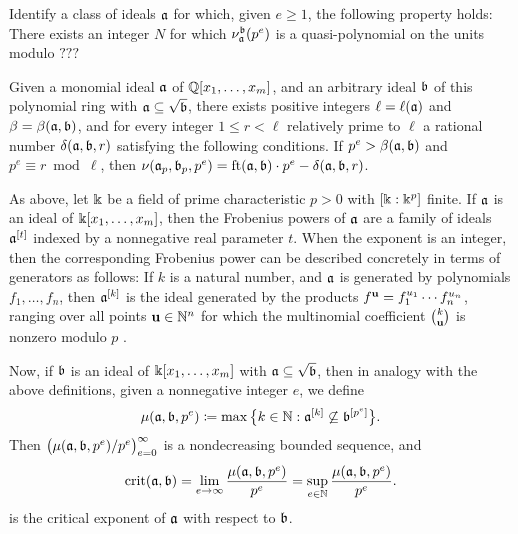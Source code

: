 \documentclass[11pt]{amsart}
\begin{document}
\begin{problem}
Identify a class of ideals $\mathfrak{a}$ for which, given $e \geq 1$, the following property holds:  There exists an integer $N$ for which $\nu_{\mathfrak{a}}^{\mathfrak{b}}(p^e)$ is a quasi-polynomial on the units modulo $???$
\end{problem}
%
%
\begin{theorem}
   \label{general-nu-theorem: T}
   Given a monomial ideal $\mathfrak{a}$ of $\mathbb{Q}[x_1, \ldots, x_m]$, and an arbitrary ideal $\mathfrak{b}$ of this polynomial ring with $\mathfrak{a} \subseteq \sqrt{\mathfrak{b}}$, there exists positive integers $\ell = \ell(\mathfrak{a})$ and  $\beta = \beta(\mathfrak{a}, \mathfrak{b})$, and for every integer $1 \leq r < \ell$ relatively prime to $\ell$ a rational number $\delta(\mathfrak{a}, \mathfrak{b}, r)$ satisfying the following conditions.
   If $p^e > \beta(\mathfrak{a}, \mathfrak{b})$ and $p^e \equiv r \bmod \ell$, then $ \nu(\mathfrak{a}_p, \mathfrak{b}_p, p^e) = \operatorname{ft}(\mathfrak{a}, \mathfrak{b}) \cdot p^e - \delta(\mathfrak{a}, \mathfrak{b}, r)$.
\end{theorem}

As above, let $\Bbbk$ be a field of prime characteristic $p>0$ with $[\Bbbk: \Bbbk^p]$ finite.
If $\mathfrak{a}$ is an ideal of $\Bbbk[x_1, \ldots, x_m]$, then the Frobenius powers of $\mathfrak{a}$ are a family of ideals $\mathfrak{a}^{[t]}$ indexed by a nonnegative real parameter $t$.
When the exponent is an integer, then the corresponding Frobenius power can be described concretely in terms of generators as follows:
If $k$ is a natural number, and $\mathfrak{a}$ is generated by polynomials $f_1, \ldots, f_n$, then $\mathfrak{a}^{[k]}$ is the ideal generated by the products $f^{\mathbf{u}} = f_1^{u_1}\cdots f_n^{u_n}$, ranging over all points $\mathbf{u} \in \mathbb{N}^n$ for which the multinomial coefficient $\binom{k}{\mathbf{u}}$ is nonzero modulo $p$  \cite[Proposition~3.5]{hernandez+etal.frobenius_powers}.

Now, if $\mathfrak{b}$ is an ideal of $\Bbbk[x_1, \ldots, x_m]$ with $\mathfrak{a} \subseteq \sqrt{\mathfrak{b}}$, then in analogy with the above definitions, given a nonnegative integer $e$, we define
\[\mu(\mathfrak{a},\mathfrak{b},p^e) \coloneqq \max\big\{k\in \mathbb{N} : \mathfrak{a}^{[k]} \not\subseteq \mathfrak{b}^{[p^e]}\big\}.\]
Then $\big(\mu(\mathfrak{a},\mathfrak{b},p^e)/p^e\big)_{e=0}^{\infty}$ is a nondecreasing bounded sequence, and
\begin{equation}\label{eq: crit as a limit of mus}
   \operatorname{crit}(\mathfrak{a},\mathfrak{b}) = \lim_{e\to \infty} \frac{\mu(\mathfrak{a},\mathfrak{b},p^e)}{p^e} = \sup_{e\in \mathbb{N}} \frac{\mu(\mathfrak{a},\mathfrak{b},p^e)}{p^e}.
\end{equation}
is the critical exponent of $\mathfrak{a}$ with respect to $\mathfrak{b}$.
\end{document}
